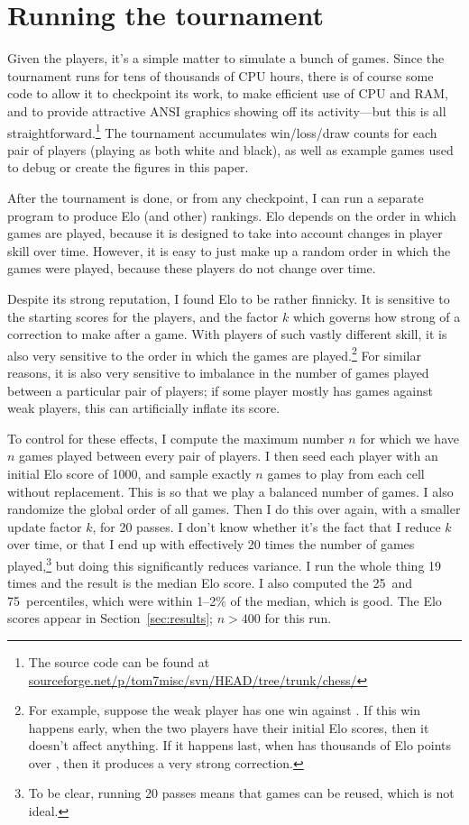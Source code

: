 \documentclass[10pt,preprint,twocolumn]{acmart}
\begin{document}
\section{Running the tournament}

Given the players, it's a simple matter to simulate a bunch of games.
Since the tournament runs for tens of thousands of CPU hours, there is
of course some code to allow it to checkpoint its work, to make
efficient use of CPU and RAM, and to provide attractive ANSI graphics
showing off its activity---but this is all straightforward.\footnote{
  The source code can be found at
  \url{sourceforge.net/p/tom7misc/svn/HEAD/tree/trunk/chess/}
} The
tournament accumulates win/loss/draw counts for each pair of players
(playing as both white and black), as well as example games used to
debug or create the figures in this paper.

After the tournament is done, or from any checkpoint, I can run a
separate program to produce Elo (and other) rankings. Elo depends
on the order in which games are played, because it is designed to take
into account changes in player skill over time. However, it is easy
to just make up a random order in which the games were played, because
these players do not change over time.

Despite its strong reputation, I found Elo to be rather finnicky. It
is sensitive to the starting scores for the players, and the factor
$k$ which governs how strong of a correction to make after a game.
With players of such vastly different skill, it is also very sensitive
to the order in which the games are played.\footnote{For example,
  suppose the weak player  has one win against
  . If this win happens early, when the two
  players have their initial Elo scores, then it doesn't affect
  anything. If it happens last, when  has
  thousands of Elo points over , then it produces
  a very strong correction.} For similar reasons, it is also very
sensitive to imbalance in the number of games played between a
particular pair of players; if some player mostly has games against
weak players, this can artificially inflate its score.

To control for these effects, I compute the maximum number $n$ for
which we have $n$ games played between every pair of players. I then
seed each player with an initial Elo score of 1000, and sample exactly
$n$ games to play from each cell without replacement. This is so that
we play a balanced number of games. I also randomize the global order
of all games. Then I do this over again, with a smaller update factor
$k$, for 20 passes. I don't know whether it's the fact that I reduce
$k$ over time, or that I end up with effectively 20 times the number
of games played,\footnote{To be clear, running 20 passes means that
  games can be reused, which is not ideal.} but doing this
significantly reduces variance. I run the whole thing 19 times and the
result is the median Elo score. I also computed the 25\th\ and
75\th\ percentiles, which were within 1--2\% of the median, which is
good. The Elo scores appear in Section~\ref{sec:results}; $n > 400$
for this run.
\end{document}
